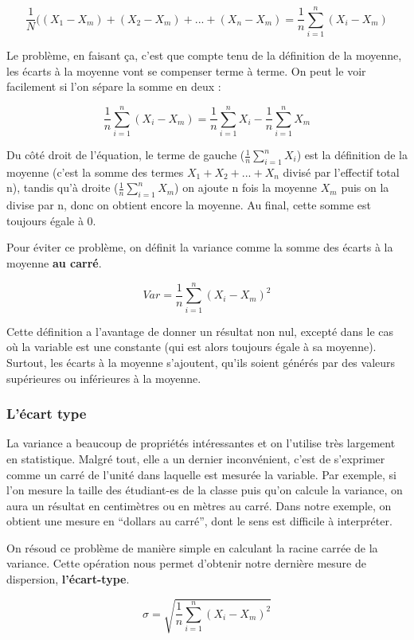 \documentclass[
]{book}
\begin{document}
\[ \frac{1}{N}( (X_1 - X_m) + (X_2 - X_m) + ... + (X_n - X_m) = \frac{1}{n} \sum_{i = 1}^{n} (X_i - X_m) \]

Le problème, en faisant ça, c'est que compte tenu de la définition de la moyenne, les écarts à la moyenne vont se compenser terme à terme. On peut le voir facilement si l'on sépare la somme en deux :

\[ \frac{1}{n} \sum_{i = 1}^{n} (X_i - X_m) = \frac{1}{n} \sum_{i = 1}^{n} X_i - \frac{1}{n} \sum_{i = 1}^{n} X_m \]

Du côté droit de l'équation, le terme de gauche (\(\frac{1}{n} \sum_{i = 1}^{n} X_i\)) est la définition de la moyenne (c'est la somme des termes \(X_1+X_2+...+X_n\) divisé par l'effectif total n), tandis qu'à droite (\(\frac{1}{n} \sum_{i = 1}^{n} X_m\)) on ajoute n fois la moyenne \(X_m\) puis on la divise par n, donc on obtient encore la moyenne. Au final, cette somme est toujours égale à 0.

Pour éviter ce problème, on définit la variance comme la somme des écarts à la moyenne \textbf{au carré}.

\[ Var = \frac{1}{n} \sum_{i = 1}^{n} (X_i - X_m)^2 \]

Cette définition a l'avantage de donner un résultat non nul, excepté dans le cas où la variable est une constante (qui est alors toujours égale à sa moyenne). Surtout, les écarts à la moyenne s'ajoutent, qu'ils soient générés par des valeurs supérieures ou inférieures à la moyenne.

\hypertarget{luxe9cart-type}{%
\subsubsection{L'écart type}\label{luxe9cart-type}}

La variance a beaucoup de propriétés intéressantes et on l'utilise très largement en statistique. Malgré tout, elle a un dernier inconvénient, c'est de s'exprimer comme un carré de l'unité dans laquelle est mesurée la variable. Par exemple, si l'on mesure la taille des étudiant-es de la classe puis qu'on calcule la variance, on aura un résultat en centimètres ou en mètres au carré. Dans notre exemple, on obtient une mesure en ``dollars au carré'', dont le sens est difficile à interpréter.

On résoud ce problème de manière simple en calculant la racine carrée de la variance. Cette opération nous permet d'obtenir notre dernière mesure de dispersion, \textbf{l'écart-type}.

\[ \sigma = \sqrt{\frac{1}{n} \sum_{i = 1}^{n} (X_i - X_m)^2} \]
\end{document}
